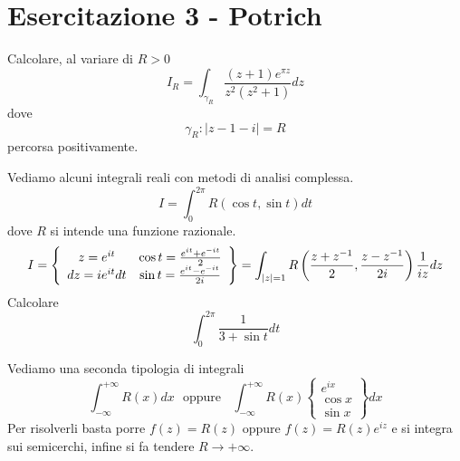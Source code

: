 \chapter{Esercitazione 3 - Potrich}
\ParteEsercizi
\Esercizio{}

Calcolare, al variare di $R > 0$
\begin{equation*}
I_{R} = \int_{\gamma_{R}}\frac{\left(z + 1\right) e^{\pi z}}{z^{2}\left(z^{2} + 1\right)} dz
\end{equation*}
dove
\begin{equation*}
\gamma_{R} :\left| z - 1 - i\right| = R
\end{equation*}
percorsa positivamente.
\Esercizio{}

Vediamo alcuni integrali reali con metodi di analisi complessa.
\begin{equation*}
I = \boxed{\int^{2\pi}_{0} R\left(\cos t, \sin t\right) dt}
\end{equation*}
dove $R$ si intende una funzione razionale.
\begin{equation*}
I = \left\{
\begin{array}{c c}
z = e^{it} & \cos t = \frac{e^{it} + e^{- it}}{2}\\
dz = ie^{it} dt & \sin t = \frac{e^{it} - e^{- it}}{2i}
\end{array}\right\} = \int_{\left| z\right| = 1} R\left(\frac{z + z^{- 1}}{2}, \frac{z - z^{- 1}}{2i}\right)\frac{1}{iz} dz
\end{equation*}
Calcolare
\begin{equation*}
\int^{2\pi}_{0}\frac{1}{3 + \sin t} dt
\end{equation*}
\Esercizio{}

Vediamo una seconda tipologia di integrali
\begin{equation*}
\boxed{\int^{+ \infty}_{- \infty} R(x) dx} \ \ \ \text{oppure} \ \ \ \ \boxed{\int^{+ \infty}_{- \infty} R(x)\left\{
\begin{array}{c}
e^{ix}\\
\cos x\\
\sin x
\end{array}\right\} dx}
\end{equation*}
Per risolverli basta porre $f(z) = R(z)$ oppure $f(z) = R(z) e^{iz}$ e si integra sui semicerchi, infine si fa tendere $R\rightarrow + \infty $.

